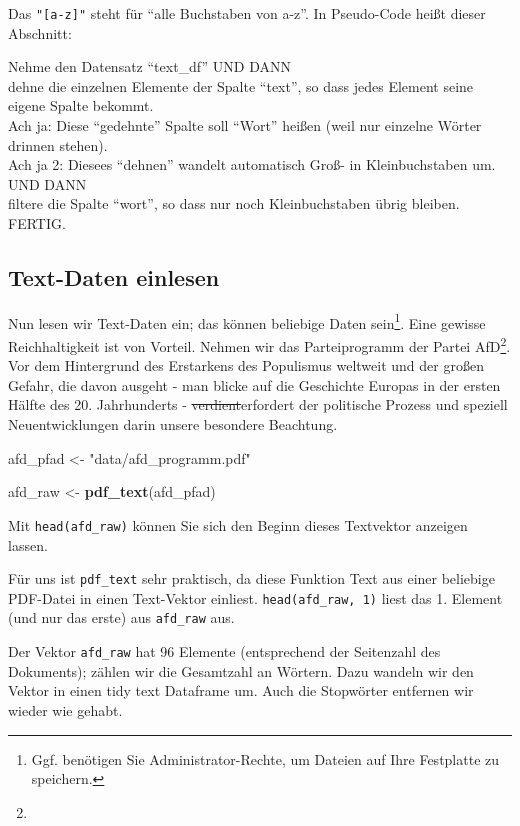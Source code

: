 \documentclass[12pt,ngerman,]{book}
\makeatletter
\newenvironment{Shaded}{\begin{snugshade}}{\end{snugshade}}
\newcommand{\KeywordTok}[1]{\textcolor[rgb]{0.13,0.29,0.53}{\textbf{#1}}}
\newcommand{\StringTok}[1]{\textcolor[rgb]{0.31,0.60,0.02}{#1}}
\newcommand{\NormalTok}[1]{#1}
\let\rmarkdownfootnote\footnote%
\def\footnote{\protect\rmarkdownfootnote}
\newenvironment{kframe}{%
\medskip{}
\setlength{\fboxsep}{.8em}
 \def\at@end@of@kframe{}%
 \ifinner\ifhmode%
  \def\at@end@of@kframe{\end{minipage}}%
  \begin{minipage}{\columnwidth}%
 \fi\fi%
 \def\FrameCommand##1{\hskip\@totalleftmargin \hskip-\fboxsep
 \colorbox{shadecolor}{##1}\hskip-\fboxsep
     \hskip-\linewidth \hskip-\@totalleftmargin \hskip\columnwidth}%
 \MakeFramed {\advance\hsize-\width
   \@totalleftmargin\z@ \linewidth\hsize
   \@setminipage}}%
 {\par\unskip\endMakeFramed%
 \at@end@of@kframe}
\renewenvironment{Shaded}{\begin{kframe}}{\end{kframe}}
\theoremstyle{definition}
\theoremstyle{definition}
\theoremstyle{remark}
\let\BeginKnitrBlock\begin \let\EndKnitrBlock\end
\makeatother
\begin{document}
Das \texttt{"{[}a-z{]}"} steht für ``alle Buchstaben von a-z''. In
Pseudo-Code heißt dieser Abschnitt:

\BeginKnitrBlock{rmdpseudocode}
Nehme den Datensatz ``text\_df'' UND DANN\\
dehne die einzelnen Elemente der Spalte ``text'', so dass jedes Element
seine eigene Spalte bekommt.\\
Ach ja: Diese ``gedehnte'' Spalte soll ``Wort'' heißen (weil nur
einzelne Wörter drinnen stehen).\\
Ach ja 2: Diesees ``dehnen'' wandelt automatisch Groß- in
Kleinbuchstaben um. UND DANN\\
filtere die Spalte ``wort'', so dass nur noch Kleinbuchstaben übrig
bleiben. FERTIG.
\EndKnitrBlock{rmdpseudocode}

\subsection{Text-Daten einlesen}\label{text-daten-einlesen}

Nun lesen wir Text-Daten ein; das können beliebige Daten sein\footnote{Ggf.
  benötigen Sie Administrator-Rechte, um Dateien auf Ihre Festplatte zu
  speichern.}. Eine gewisse Reichhaltigkeit ist von Vorteil. Nehmen wir
das Parteiprogramm der Partei AfD\footnote{}. Vor dem Hintergrund des
Erstarkens des Populismus weltweit und der großen Gefahr, die davon
ausgeht - man blicke auf die Geschichte Europas in der ersten Hälfte des
20. Jahrhunderts - \sout{verdient}erfordert der politische Prozess und
speziell Neuentwicklungen darin unsere besondere Beachtung.

\begin{Shaded}
\begin{Highlighting}[]
\NormalTok{afd_pfad <-}\StringTok{ "data/afd_programm.pdf"}

\NormalTok{afd_raw <-}\StringTok{ }\KeywordTok{pdf_text}\NormalTok{(afd_pfad)}
\end{Highlighting}
\end{Shaded}

Mit \texttt{head(afd\_raw)} können Sie sich den Beginn dieses Textvektor
anzeigen lassen.

Für uns ist \texttt{pdf\_text} sehr praktisch, da diese Funktion Text
aus einer beliebige PDF-Datei in einen Text-Vektor einliest.
\texttt{head(afd\_raw,\ 1)} liest das 1. Element (und nur das erste) aus
\texttt{afd\_raw} aus.

Der Vektor \texttt{afd\_raw} hat 96 Elemente (entsprechend der
Seitenzahl des Dokuments); zählen wir die Gesamtzahl an Wörtern. Dazu
wandeln wir den Vektor in einen tidy text Dataframe um. Auch die
Stopwörter entfernen wir wieder wie gehabt.
\end{document}

